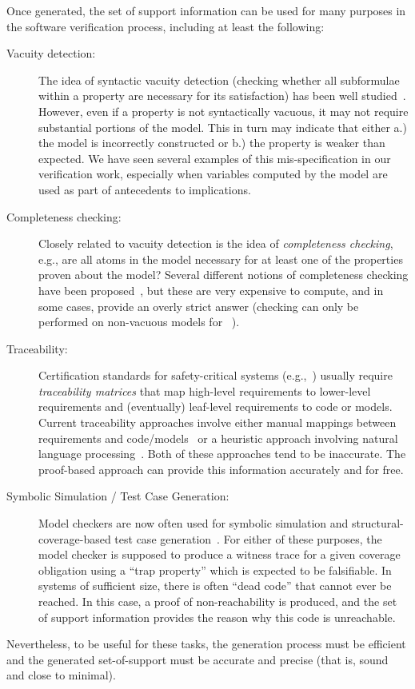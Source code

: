 Once generated, the set of support information can be used for many purposes in the software verification process, including at least the following:
\begin{description}
    \item[Vacuity detection:] The idea of syntactic vacuity detection (checking whether all subformulae within a property are necessary for its satisfaction) has been well studied~\cite{Kupferman}.   However, even if a property is not syntactically vacuous, it may not require substantial portions of the model.  This in turn may indicate that either a.) the model is incorrectly constructed or b.) the property is weaker than expected.  We have seen several examples of this mis-specification in our verification work, especially when variables computed by the model are used as part of antecedents to implications.
    \item[Completeness checking:] Closely related to vacuity detection is the idea of {\em completeness checking}, e.g., are all atoms in the model necessary for at least one of the properties proven about the model?  Several different notions of completeness checking have been proposed~\cite{Chockler, Kupferman}, but these are very expensive to compute, and in some cases, provide an overly strict answer (checking can only be performed on non-vacuous models for~\cite{Kupferman} ).
    \item[Traceability:] Certification standards for safety-critical systems (e.g.,~\cite{DO178B,MOD-0055}) usually require {\em traceability matrices} that map high-level requirements to lower-level requirements and (eventually) leaf-level requirements to code or models.  Current traceability approaches involve either manual mappings between requirements and code/models~\cite{Simulink} or a heuristic approach involving natural language processing~\cite{Huang}.  Both of these approaches tend to be inaccurate.  The proof-based approach can provide this information accurately and for free.
    \item[Symbolic Simulation / Test Case Generation:]  Model checkers are now often used for symbolic simulation and structural-coverage-based test case generation~\cite{Simulink Design Verifier, Our work}.  For either of these purposes, the model checker is supposed to produce a witness trace for a given coverage obligation using a ``trap property'' which is expected to be falsifiable.  In systems of sufficient size, there is often ``dead code'' that cannot ever be reached.  In this case, a proof of non-reachability is produced, and the set of support information provides the reason why this code is unreachable.
\end{description}
\noindent Nevertheless, to be useful for these tasks, the generation
process must be efficient and the generated set-of-support must be
accurate and precise (that is, sound and close to minimal).


